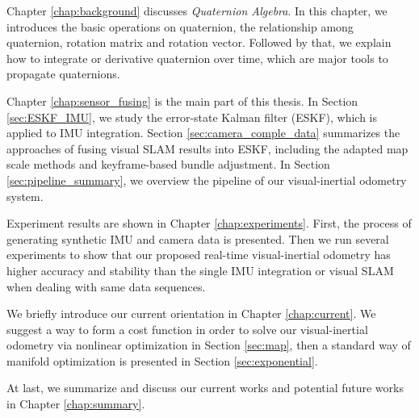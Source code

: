 Chapter \ref{chap:background} discusses \textit{Quaternion Algebra}. In this chapter, we introduces the basic operations on quaternion, the relationship among quaternion, rotation matrix and rotation vector. Followed by that, we explain how to integrate or derivative quaternion over time, which are major tools to propagate quaternions.

Chapter \ref{chap:sensor_fusing} is the main part of this thesis. In Section \ref{sec:ESKF_IMU}, we study the error-state Kalman filter (ESKF), which is applied to IMU integration. Section \ref{sec:camera_comple_data} summarizes the approaches of fusing visual SLAM results into ESKF, including the adapted map scale methods and keyframe-based bundle adjustment. In Section \ref{sec:pipeline_summary}, we overview the pipeline of our visual-inertial odometry system.

Experiment results are shown in Chapter \ref{chap:experiments}. First, the process of generating synthetic IMU and camera data is presented. Then we run several experiments to show that our proposed real-time visual-inertial odometry has higher accuracy and stability than the single IMU integration or visual SLAM when dealing with same data sequences. 

We briefly introduce our current orientation in Chapter \ref{chap:current}. We suggest a way to form a cost function in order to solve our visual-inertial odometry via nonlinear optimization in Section \ref{sec:map}, then a standard way of manifold optimization is presented in Section \ref{sec:exponential}.

At last, we summarize and discuss our current works and potential future works in Chapter \ref{chap:summary}.
